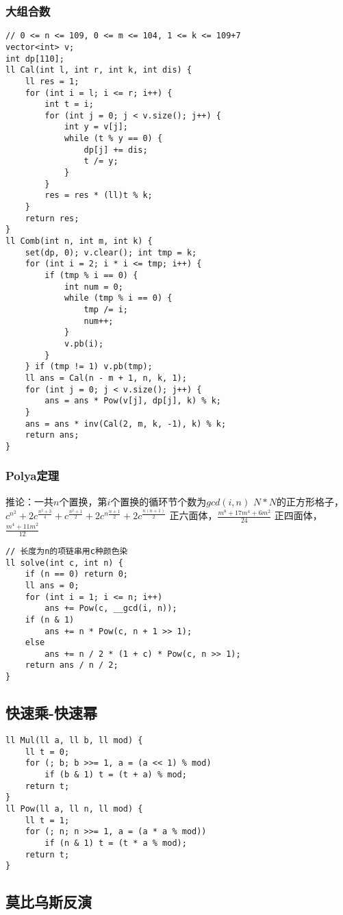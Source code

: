 \documentclass[a4]{article}
\begin{document}
\subsubsection{大组合数}
\begin{lstlisting}
// 0 <= n <= 109, 0 <= m <= 104, 1 <= k <= 109+7
vector<int> v;
int dp[110];
ll Cal(int l, int r, int k, int dis) {
	ll res = 1;
	for (int i = l; i <= r; i++) {
		int t = i;
		for (int j = 0; j < v.size(); j++) {
			int y = v[j];
			while (t % y == 0) {
				dp[j] += dis;
				t /= y;
			}
		}
		res = res * (ll)t % k;
	}
	return res;
}
ll Comb(int n, int m, int k) {
	set(dp, 0); v.clear(); int tmp = k;
	for (int i = 2; i * i <= tmp; i++) {
		if (tmp % i == 0) {
			int num = 0;
			while (tmp % i == 0) {
				tmp /= i;
				num++;
			}
			v.pb(i);
		}
	} if (tmp != 1) v.pb(tmp);
	ll ans = Cal(n - m + 1, n, k, 1);
	for (int j = 0; j < v.size(); j++) {
		ans = ans * Pow(v[j], dp[j], k) % k;
	}
	ans = ans * inv(Cal(2, m, k, -1), k) % k;
	return ans;
}
\end{lstlisting}
\subsubsection{Polya定理}
推论：一共$n$个置换，第$i$个置换的循环节个数为$gcd(i,n)$
$N*N$的正方形格子，$c^{n^2}+2c^{\frac{n^2+3}{4}}+c^{\frac{n^2+1}{2}}+2c^{n\frac{n+1}{2}}+2c^{\frac{n(n+1)}{2}}$
正六面体，$\frac{m^8+17m^4+6m^2}{24}$
正四面体，$\frac{m^4+11m^2}{12}$\begin{lstlisting}
// 长度为n的项链串用c种颜色染
ll solve(int c, int n) {
	if (n == 0) return 0;
	ll ans = 0;
	for (int i = 1; i <= n; i++)
		ans += Pow(c, __gcd(i, n));
	if (n & 1)
		ans += n * Pow(c, n + 1 >> 1);
	else
		ans += n / 2 * (1 + c) * Pow(c, n >> 1);
	return ans / n / 2;
}
\end{lstlisting}
\subsection{快速乘-快速幂}
\begin{lstlisting}
ll Mul(ll a, ll b, ll mod) {
	ll t = 0;
	for (; b; b >>= 1, a = (a << 1) % mod)
		if (b & 1) t = (t + a) % mod;
	return t;
} 
ll Pow(ll a, ll n, ll mod) {
	ll t = 1;
	for (; n; n >>= 1, a = (a * a % mod))
		if (n & 1) t = (t * a % mod);
	return t;
}
\end{lstlisting}
\subsection{莫比乌斯反演}
\end{document}

